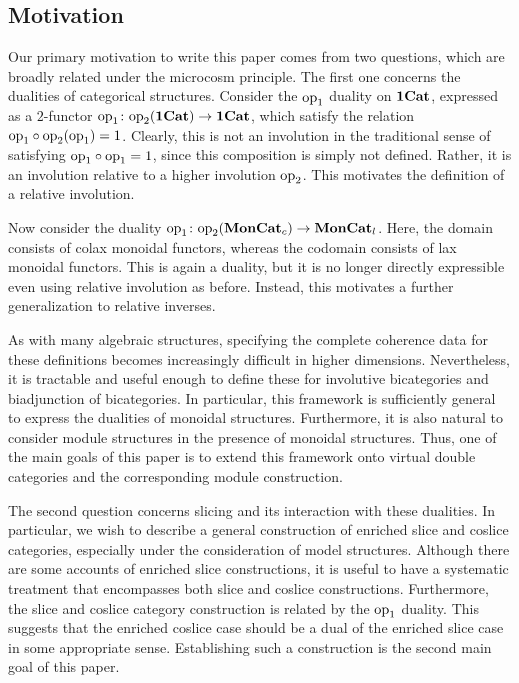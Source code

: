 \subsection{Motivation}

Our primary motivation to write this paper comes from two questions, which are broadly related under the microcosm principle. The first one concerns the dualities of categorical structures. Consider the $\mathrm{op}_1$ duality on $\mathbf{1\mathbf{Cat}}$, expressed as a $2$-functor $\mathrm{op}_1 \colon \mathrm{op}_2 (\mathbf{1\mathbf{Cat}}) \rightarrow \mathbf{1\mathbf{Cat}}$, which satisfy the relation $\mathrm{op}_1 \circ \mathrm{op}_2 (\mathrm{op}_1) =1$. Clearly, this is not an involution in the traditional sense of satisfying $\mathrm{op}_1 \circ \mathrm{op}_1 = 1$, since this composition is simply not defined. Rather, it is an involution relative to a higher involution $\mathrm{op}_2$. This motivates the definition of a relative involution.

Now consider the duality $\mathrm{op}_1 \colon \mathrm{op}_2(\mathbf{MonCat}_{c}) \rightarrow \mathbf{MonCat}_{l}$. Here, the domain consists of colax monoidal functors, whereas the codomain consists of lax monoidal functors. This is again a duality, but it is no longer directly expressible even using relative involution as before. Instead, this motivates a further generalization to relative inverses. 

As with many algebraic structures, specifying the complete coherence data for these definitions becomes increasingly difficult in higher dimensions. Nevertheless, it is tractable and useful enough to define these for involutive bicategories and biadjunction of bicategories. In particular, this framework is sufficiently general to express the dualities of monoidal structures. Furthermore, it is also natural to consider module structures in the presence of monoidal structures. Thus, one of the main goals of this paper is to extend this framework onto virtual double categories and the corresponding module construction.  

The second question concerns slicing and its interaction with these dualities. In particular, we wish to describe a general construction of enriched slice and coslice categories, especially under the consideration of model structures. Although there are some accounts of enriched slice constructions, it is useful to have a systematic treatment that encompasses both slice and coslice constructions. Furthermore, the slice and coslice category construction is related by the $\mathrm{op}_1$ duality. This suggests that the enriched coslice case should be a dual of the enriched slice case in some appropriate sense. Establishing such a construction is the second main goal of this paper.


